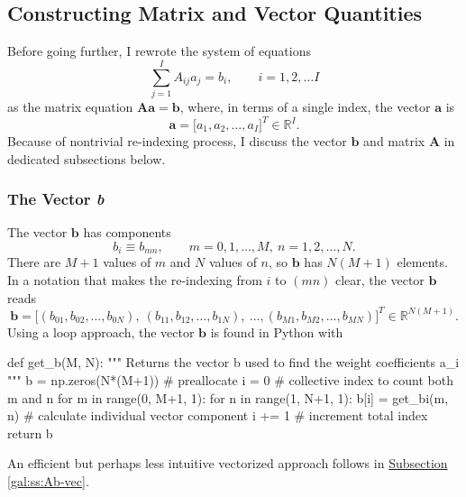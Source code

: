 \documentclass[11pt, a4paper]{article}
\newcommand{\mat}[1]{\mathbf{#1}}
\renewcommand{\vec}[1]{\bm{#1}}
\begin{document}
\subsection{Constructing Matrix and Vector Quantities}
Before going further, I rewrote the system of equations
\begin{equation*}
	\sum_{j=1}^{I}A_{ij}a_{j} = b_{i}, \qquad i = 1, 2, \ldots I
\end{equation*}
as the matrix equation $ \mat{A} \vec{a} = \vec{b} $, where, in terms of a single index, the vector $ \vec{a} $ is
\begin{equation*}
	\vec{a} = \big[a_{1}, a_{2}, \ldots, a_{I} \big]^{T} \in \mathbb{R}^{I}.	
\end{equation*}
Because of nontrivial re-indexing process, I discuss the vector $ \vec{b} $ and matrix $ \mat{A} $ in dedicated subsections below.

\subsubsection{The Vector \textit{b}}
 The vector $ \vec{b} $ has components
\begin{equation*}
	b_{i} \equiv b_{mn}, \qquad m = 0, 1, \ldots, M, \ n = 1, 2, \ldots, N.
\end{equation*}
There are $ M+1 $ values of $ m $ and $ N $ values of $ n $, so $ \vec{b} $ has $ N(M+1) $ elements. In a notation that makes the re-indexing from $ i $ to $ (mn) $ clear, the vector $ \vec{b} $ reads
\begin{equation*}
	\vec{b} = \Big[(b_{01}, b_{02}, \ldots, b_{0N})\bm{,} \ (b_{11}, b_{12}, \ldots, b_{1N})\bm{,} \ \ldots\bm{,}(b_{M1}, b_{M2}, \ldots, b_{MN}) \Big]^{T} \in \mathbb{R}^{N(M+1)}.
\end{equation*}
Using a loop approach, the vector $ \vec{b} $ is found in Python with
\begin{python}
def get_b(M, N):
    """ Returns the vector b used to find the weight coefficients a_i """
    b = np.zeros(N*(M+1))  # preallocate
    i = 0  # collective index to count both m and n
    for m in range(0, M+1, 1):
        for n in range(1, N+1, 1):
            b[i] = get_bi(m, n)  # calculate individual vector component
            i += 1               # increment total index
    return b
\end{python}
An efficient but perhaps less intuitive vectorized approach follows in \hyperref[gal:ss:Ab-vec]{Subsection \ref{gal:ss:Ab-vec}}.
\end{document}
